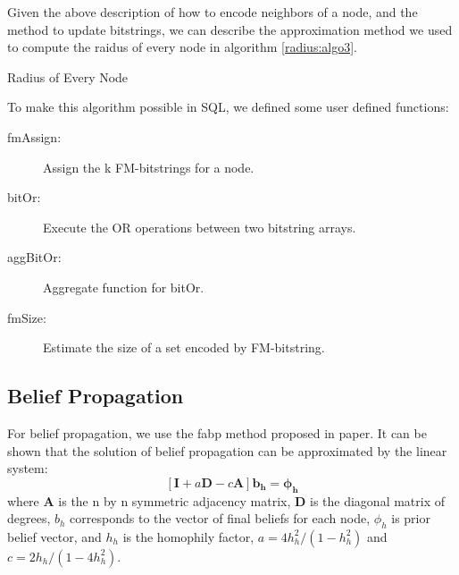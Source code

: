 Given the above description of how to encode neighbors of a node, and the method to update bitstrings, we can describe the approximation method we used to compute the raidus of every node in algorithm \ref{radius:algo3}.

\begin{algorithm}
\caption{Radius of Every Node}
\begin{algorithmic}
\REPEAT
{}
\end{algorithmic}
\label{radius:algo3}
\end{algorithm}


To make this algorithm possible in SQL, we defined some user defined functions:
\begin{description}
  \item[fmAssign:] Assign the k FM-bitstrings for a node.
  \item[bitOr:] Execute the OR operations between two bitstring arrays.
  \item[aggBitOr:] Aggregate function for bitOr.
  \item[fmSize:] Estimate the size of a set encoded by FM-bitstring.
\end{description}

\subsection{Belief Propagation}
For belief propagation, we use the fabp method proposed in paper\cite{DBLP:conf/pkdd/KoutraKKCPF11}.
It can be shown that the solution of belief propagation can be approximated by the linear system:$$[\mathbf{I}	 + a\mathbf{D} - c\mathbf{A}]\mathbf{b_h} = \mathbf{\phi_h}$$ 
where $\mathbf{A}$ is the n by n symmetric adjacency matrix, $\mathbf{D}$ is the diagonal matrix of degrees, $b_h$ corresponds to the vector of final beliefs for each node, $\phi_h$ is prior belief vector, and $h_h$ is the homophily factor,  $a = 4h_h^2/(1 - h_h^2)$ and $c = 2h_h / (1-4h_h^2)$.


